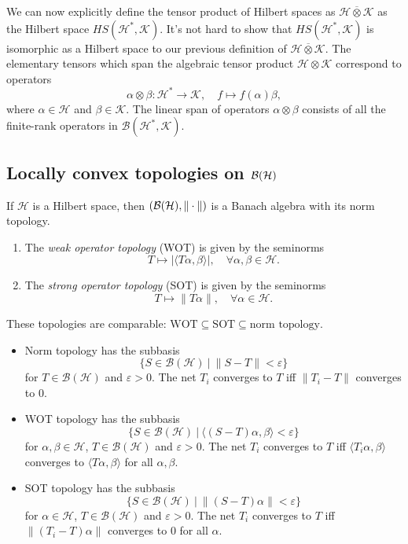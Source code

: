 We can now explicitly define the {tensor product of Hilbert spaces} as $\mathcal{H} \overline{\otimes} \mathcal{K}$ as the Hilbert space $HS (\mathcal{H}^*, \mathcal{K})$. 
It's not hard to show that $HS (\mathcal{H}^*, \mathcal{K})$ is isomorphic as a Hilbert space to our previous definition of $\mathcal{H} \overline{\otimes} \mathcal{K}$.
The elementary tensors which span the algebraic tensor product $\mathcal{H} \otimes \mathcal{K}$ correspond to operators
$$\alpha \otimes \beta: \mathcal{H}^* \to \mathcal{K},\quad f \mapsto f(\alpha) \beta,$$
where $\alpha \in \mathcal{H}$ and $\beta \in \mathcal{K}$.
The linear span of operators $\alpha \otimes \beta$
consists of all the finite-rank operators in $\mathcal{B} (\mathcal{H}^*, \mathcal{K})$.

\subsection{Locally convex topologies on $\operatorname{\mathcal{B} (\mathcal{H})}$}

If $\mathcal{H}$ is a Hilbert space, then $(\operatorname{\mathcal{B} (\mathcal{H})}, \| \cdot\|)$
is a Banach algebra with its norm topology.

\begin{definition}
  \begin{enumerate}
    \item The \emph{weak operator topology} (WOT) is given by the seminorms 
    $$T \mapsto |\langle T\alpha, \beta\rangle|,\quad \forall \alpha, \beta \in \mathcal{H}.$$
    \item The \emph{strong operator topology} (SOT) is given by the seminorms 
    $$T \mapsto \|T\alpha\|,\quad \forall \alpha \in \mathcal{H}.$$
  \end{enumerate}
\end{definition}

These topologies are comparable: $\mathrm{WOT} \subseteq \mathrm{SOT} \subseteq \textrm{norm topology}$.
\begin{itemize}
  \item Norm topology has the subbasis $$\{S \in \mathcal{B}(\mathcal{H})\ |\ \| S - T\| < \varepsilon \}$$
for $T \in \mathcal{B}(\mathcal{H})$ and $\varepsilon > 0$. The net $T_i$ converges to $T$ iff $\| T_i - T\|$ converges to $0$.
  \item WOT topology has the subbasis $$\{S \in \mathcal{B}(\mathcal{H})\ |\ \langle (S - T) \alpha, \beta \rangle < \varepsilon \}$$
  for $\alpha, \beta \in \mathcal{H}$, $T \in \mathcal{B}(\mathcal{H})$ and $\varepsilon > 0$. The net $T_i$ converges to $T$ iff $\langle T_i \alpha, \beta \rangle$ converges to $\langle T \alpha, \beta \rangle$ for all $\alpha, \beta$.
  \item SOT topology has the subbasis $$\{S \in \mathcal{B}(\mathcal{H})\ |\ \| (S - T) \alpha\| < \varepsilon \}$$
  for $\alpha \in \mathcal{H}$, $T \in \mathcal{B}(\mathcal{H})$ and $\varepsilon > 0$. The net $T_i$ converges to $T$ iff $\| (T_i - T)\alpha \|$ converges to $0$ for all $\alpha$.
\end{itemize}

